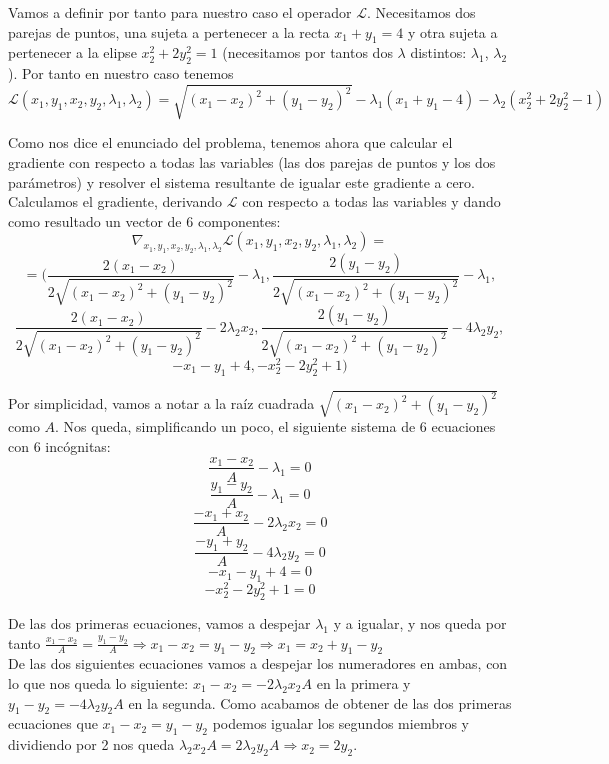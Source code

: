 \documentclass[12pt]{article}
\theoremstyle{definition}
\begin{document}
\begin{pregunta}
Vamos a definir por tanto para nuestro caso el operador $\mathcal{L}$. Necesitamos dos parejas de puntos, una sujeta a pertenecer a la recta $x_1+y_1=4$ y otra sujeta a pertenecer a la elipse $x_2^2+2y_2^2=1$ (necesitamos por tantos dos $\lambda$ distintos: $\lambda_1$, $\lambda_2$). Por tanto en nuestro caso tenemos
\begin{equation}
\mathcal{L}(x_1,y_1,x_2,y_2,\lambda_1, \lambda_2) = \sqrt{(x_1-x_2)^2+(y_1-y_2)^2} - \lambda_1(x_1+y_1-4) - \lambda_2(x_2^2+2y_2^2-1)
\end{equation}
    
Como nos dice el enunciado del problema, tenemos ahora que calcular el gradiente con respecto a todas las variables (las dos parejas de puntos y los dos parámetros) y resolver el sistema resultante de igualar este gradiente a cero. Calculamos el gradiente, derivando $\mathcal{L}$ con respecto a todas las variables y dando como resultado un vector de 6 componentes:
\[
	\nabla_{x_1,y_1,x_2,y_2,\lambda_1, \lambda_2} \mathcal{L}(x_1,y_1,x_2,y_2,\lambda_1, \lambda_2)=
\]
\[
	=(\frac{2(x_1-x_2)}{2\sqrt{(x_1-x_2)^2+(y_1-y_2)^2}} - \lambda_1, \frac{2(y_1-y_2)}{2\sqrt{(x_1-x_2)^2+(y_1-y_2)^2}} - \lambda_1,
\]
\[
	\frac{2(x_1-x_2)}{2\sqrt{(x_1-x_2)^2+(y_1-y_2)^2}} - 2\lambda_2x_2, \frac{2(y_1-y_2)}{2\sqrt{(x_1-x_2)^2+(y_1-y_2)^2}} - 4\lambda_2y_2,
\]
\[
	-x_1-y_1+4, -x_2^2-2y_2^2+1)
\]

Por simplicidad, vamos a notar a la raíz cuadrada $\sqrt{(x_1-x_2)^2+(y_1-y_2)^2}$ como $A$. Nos queda, simplificando un poco, el siguiente sistema de 6 ecuaciones con 6 incógnitas:
\[
	\frac{x_1-x_2}{A}-\lambda_1=0
\]
\[
	\frac{y_1-y_2}{A}-\lambda_1=0
\]
\[
	\frac{-x_1+x_2}{A}-2\lambda_2x_2=0
\]
\[
	\frac{-y_1+y_2}{A}-4\lambda_2y_2=0
\]
\[
	-x_1-y_1+4=0
\]
\[
	-x_2^2-2y_2^2+1=0
\]

De las dos primeras ecuaciones, vamos a despejar $\lambda_1$ y a igualar, y nos queda por tanto $\frac{x_1-x_2}{A} = \frac{y_1-y_2}{A} \Rightarrow x_1-x_2=y_1-y_2 \Rightarrow x_1=x_2+y_1-y_2$\\

De las dos siguientes ecuaciones vamos a despejar los numeradores en ambas, con lo que nos queda lo siguiente: $x_1-x_2=-2\lambda_2x_2A$ en la primera y $y_1-y_2=-4\lambda_2y_2A$ en la segunda. Como acabamos de obtener de las dos primeras ecuaciones que $x_1-x_2=y_1-y_2$ podemos igualar los segundos miembros y dividiendo por 2 nos queda $\lambda_2x_2A=2\lambda_2y_2A \Rightarrow x_2=2y_2$.\\


\end{pregunta}
\end{document}

